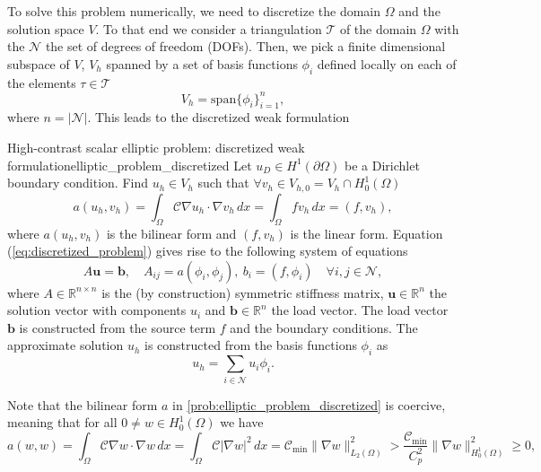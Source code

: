 To solve this problem numerically, we need to discretize the domain $\Omega$ and the solution space $V$. To that end we consider a triangulation $\mathcal{T}$ of the domain $\Omega$ with the $\mathcal{N}$ the set of degrees of freedom (DOFs). Then, we pick a finite dimensional subspace of $V$, $V_h$ spanned by a set of basis functions $\phi_i$ defined locally on each of the elements $\tau \in \mathcal{T}$
\begin{equation*}
  V_h = \text{span}\{\phi_i\}_{i=1}^{n},
\end{equation*}
where $n = |\mathcal{N}|$. This leads to the discretized weak formulation
\begin{fancyprob}{High-contrast scalar elliptic problem: discretized weak formulation}{elliptic_problem_discretized}
    Let $u_D\in H^1(\partial\Omega)$ be a Dirichlet boundary condition. Find $u_h\in V_h$ such that $\forall v_h \in V_{h,0} = V_h\cap H^1_0(\Omega)$
    \begin{equation}
        a(u_h, v_h) = \int_\Omega \mathcal{C}\nabla u_h\cdot\nabla v_h\,dx = \int_\Omega f v_h \,dx = (f, v_h),
        \label{eq:discretized_problem}
    \end{equation}
    where $a(u_h, v_h)$ is the bilinear form and $(f, v_h)$ is the linear form. Equation (\ref{eq:discretized_problem}) gives rise to the following system of equations
    \begin{equation*}
        A\mathbf{u} = \mathbf{b}, \quad A_{ij} = a(\phi_i, \phi_j), \ b_i = (f, \phi_i) \quad \forall i,j\in\mathcal{N},
    \end{equation*}
    where $A\in\mathbb{R}^{n \times n}$ is the (by construction) symmetric stiffness matrix, $\mathbf{u}\in\mathbb{R}^{n}$ the solution vector with components $u_i$ and $\mathbf{b}\in\mathbb{R}^{n}$ the load vector. The load vector $\mathbf{b}$ is constructed from the source term $f$ and the boundary conditions. The approximate solution $u_h$ is constructed from the basis functions $\phi_i$ as
    \begin{equation*}
        u_h = \sum_{i\in\mathcal{N}} u_i \phi_i.
    \end{equation*}
\end{fancyprob}
Note that the bilinear form $a$ in \cref{prob:elliptic_problem_discretized} is coercive, meaning that for all $0\neq w\in H^1_0(\Omega)$ we have
\begin{equation*}
  a(w,w) = \int_\Omega \mathcal{C} \nabla w\cdot\nabla w\,dx = \int_\Omega \mathcal{C} |\nabla w|^2\,dx = \mathcal{C}_{\text{min}} \|\nabla w\|_{L_2(\Omega)}^2> \frac{\mathcal{C}_{\text{min}}}{C_p^2}\|\nabla w\|_{H^1_0(\Omega)}^2 \geq 0,
\end{equation*}
